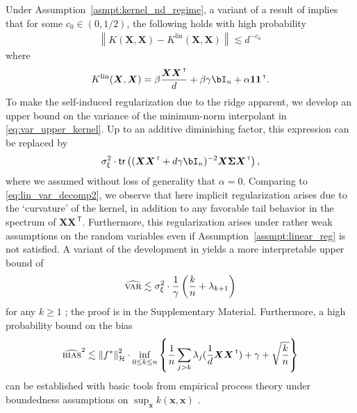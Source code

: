 Under Assumption~\ref{asmpt:kernel_nd_regime}, a variant of a result of \cite{el2010spectrum} implies that for  some $c_0\in (0,1/2)$, the following holds with high probability 
\begin{align}
	\left\|K({\boldsymbol X},{\boldsymbol X})-K^{\text{lin}}({\boldsymbol X},{\boldsymbol X})\right\| \lesssim d^{-c_0} \, 
\end{align}
where
\begin{align}
	K^{\text{lin}}({\boldsymbol X},{\boldsymbol X}) = \beta \frac{{\boldsymbol X}{\boldsymbol X}^\ensuremath{{\scriptscriptstyle\mathsf{\,T}}}}{d} + \beta \gamma \bI_n + \alpha \ensuremath{\mathbf{1}}\ensuremath{\mathbf{1}}^\ensuremath{{\scriptscriptstyle\mathsf{\,T}}}.
\end{align}
To make the self-induced regularization due to the ridge apparent, we develop an upper bound on the variance of the minimum-norm interpolant in \eqref{eq:var_upper_kernel}. Up to an additive diminishing factor, this expression can be replaced by 
\begin{align}
	\sigma_\xi^2 \cdot \mathsf{tr} \left(({\boldsymbol X}{\boldsymbol X}^\ensuremath{{\scriptscriptstyle\mathsf{\,T}}} + d\gamma \bI_n)^{-2}{\boldsymbol X}{\boldsymbol \Sigma}{\boldsymbol X}^\ensuremath{{\scriptscriptstyle\mathsf{\,T}}} \right),
\end{align}
where we assumed without loss of generality that $\alpha=0$. Comparing to \eqref{eq:lin_var_decomp2},
we observe that here implicit regularization arises due to the `curvature' of the kernel, in addition to any favorable tail behavior in the spectrum of ${\boldsymbol X}{\boldsymbol X}^\ensuremath{{\scriptscriptstyle\mathsf{\,T}}}$. Furthermore, this regularization arises under rather weak assumptions on the random variables even if Assumption~\ref{assmpt:linear_reg} is not satisfied. A variant of the development in \cite{liang2020just} yields a more interpretable upper bound of
\begin{align}
	{\widehat{\textsc{var}}} \lesssim \sigma^2_\xi \cdot \frac{1}{\gamma} \left(\frac{k}{n} + \lambda_{k+1}\right)
\end{align}
for any $k\geq 1$ \cite{liang2020amend}; the proof is in the Supplementary Material. Furthermore, a high probability bound on the bias
	\begin{align}
		\label{eq:bias_kernel_ridgeless}
		{\widehat{\textsc{bias}}^2} \lesssim \left\|f^*\right\|^2_{{\mathcal H}} \cdot \inf_{0\leq k\leq n} \left\{ \frac{1}{n}\sum_{j>k} \lambda_j(\frac{1}{d}{\boldsymbol X}{\boldsymbol X}^\ensuremath{{\scriptscriptstyle\mathsf{\,T}}}) + \gamma + \sqrt{\frac{k}{n}}\right\}
	\end{align}
can be established with basic tools from empirical process theory under boundedness assumptions on $\sup_{{\boldsymbol x}} k({\boldsymbol x},{\boldsymbol x})$ \cite{liang2020just}. 

